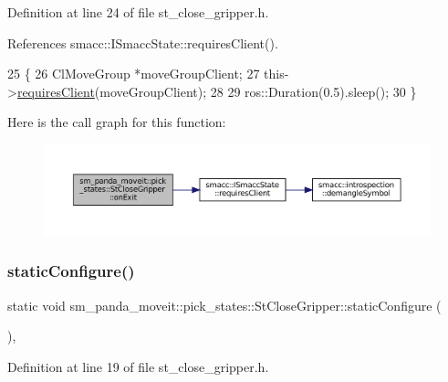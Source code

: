 Definition at line 24 of file st\+\_\+close\+\_\+gripper.\+h.



References smacc\+::\+I\+Smacc\+State\+::requires\+Client().


\begin{DoxyCode}
25    \{
26       ClMoveGroup *moveGroupClient;
27       this->\hyperlink{classsmacc_1_1ISmaccState_a7f95c9f0a6ea2d6f18d1aec0519de4ac}{requiresClient}(moveGroupClient);
28 
29       ros::Duration(0.5).sleep();
30    \}
\end{DoxyCode}
Here is the call graph for this function\+:
\nopagebreak
\begin{figure}[H]
\begin{center}
\leavevmode
\includegraphics[width=350pt]{structsm__panda__moveit_1_1pick__states_1_1StCloseGripper_a04d82ae62c8b796fc0347d51db585e03_cgraph}
\end{center}
\end{figure}
\mbox{\label{structsm__panda__moveit_1_1pick__states_1_1StCloseGripper_acdc40de3e9afc7f21e321787d56ab64e}} 
\subsubsection{\texorpdfstring{static\+Configure()}{staticConfigure()}}
{\footnotesize\ttfamily static void sm\+\_\+panda\+\_\+moveit\+::pick\+\_\+states\+::\+St\+Close\+Gripper\+::static\+Configure (\begin{DoxyParamCaption}{ }\end{DoxyParamCaption})\hspace{0.3cm}{\ttfamily [inline]}, {\ttfamily [static]}}



Definition at line 19 of file st\+\_\+close\+\_\+gripper.\+h.



